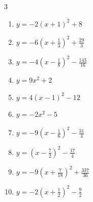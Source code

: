\begin{multicols}{3}
\begin{enumerate}

  \item $\displaystyle y=-2\left( x+1\right)^{2}+8$

        \phantom{$\displaystyle 頂点\left( -1 , 8 \right)$}

  \item $\displaystyle y=-6\left( x+\frac{1}{3}\right)^{2}+\frac{29}{3}$


  \item $\displaystyle y=-4\left( x-\frac{1}{8}\right)^{2}-\frac{143}{16}$


  \item $\displaystyle y=9x^{2}+2$

        \phantom{$\displaystyle 頂点\left( 0 , 2 \right)$}

  \item $\displaystyle y=4\left( x-1\right)^{2}-12$

        \phantom{$\displaystyle 頂点\left( 1 , -12 \right)$}

  \item $\displaystyle y=-2x^{2}-5$

        \phantom{$\displaystyle 頂点\left( 0 , -5 \right)$}

  \item $\displaystyle y=-9\left( x-\frac{1}{6}\right)^{2}-\frac{31}{4}$


\columnbreak %

\resetques

  \item $\displaystyle y=\left( x-\frac{7}{2}\right)^{2}-\frac{17}{4}$


  \item $\displaystyle y=-9\left( x+\frac{7}{18}\right)^{2}+\frac{337}{36}$


  \item $\displaystyle y=-2\left( x+\frac{1}{2}\right)^{2}-\frac{9}{2}$


\end{enumerate}
\end{multicols}
